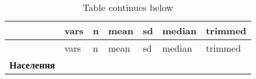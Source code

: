 \documentclass[
]{article}
\begin{document}
\begin{longtable}[]{@{}lllllll@{}}
\caption{Table continues below}\tabularnewline
\toprule
\begin{minipage}[b]{0.18\columnwidth}\raggedright
~\strut
\end{minipage} & \begin{minipage}[b]{0.08\columnwidth}\raggedright
vars\strut
\end{minipage} & \begin{minipage}[b]{0.06\columnwidth}\raggedright
n\strut
\end{minipage} & \begin{minipage}[b]{0.12\columnwidth}\raggedright
mean\strut
\end{minipage} & \begin{minipage}[b]{0.12\columnwidth}\raggedright
sd\strut
\end{minipage} & \begin{minipage}[b]{0.12\columnwidth}\raggedright
median\strut
\end{minipage} & \begin{minipage}[b]{0.13\columnwidth}\raggedright
trimmed\strut
\end{minipage}\tabularnewline
\midrule
\endfirsthead
\toprule
\begin{minipage}[b]{0.18\columnwidth}\raggedright
~\strut
\end{minipage} & \begin{minipage}[b]{0.08\columnwidth}\raggedright
vars\strut
\end{minipage} & \begin{minipage}[b]{0.06\columnwidth}\raggedright
n\strut
\end{minipage} & \begin{minipage}[b]{0.12\columnwidth}\raggedright
mean\strut
\end{minipage} & \begin{minipage}[b]{0.12\columnwidth}\raggedright
sd\strut
\end{minipage} & \begin{minipage}[b]{0.12\columnwidth}\raggedright
median\strut
\end{minipage} & \begin{minipage}[b]{0.13\columnwidth}\raggedright
trimmed\strut
\end{minipage}\tabularnewline
\midrule
\endhead
\begin{minipage}[t]{0.18\columnwidth}\raggedright
\textbf{Населення}\strut
\end{minipage} & \begin{minipage}[t]{0.08\columnwidth}\raggedright

\end{minipage}
\end{longtable}
\end{document}
